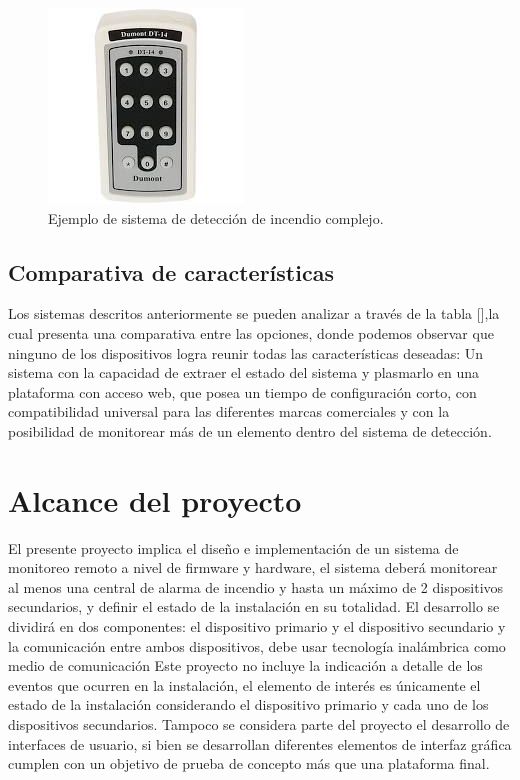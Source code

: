 \begin{figure}[h]
	\centering
	\includegraphics[scale=.4]{./Figures/Capitulo1/FIG_G1.jpeg}
	\caption{Ejemplo de sistema de detección de incendio complejo.}
	\label{fig:figura_g1}
\end{figure}

\subsection{Comparativa de características}

Los sistemas descritos anteriormente se pueden analizar a través de la tabla [],la cual  presenta una comparativa entre las opciones, donde podemos observar que ninguno de los dispositivos logra reunir todas las características deseadas: Un sistema con la capacidad de extraer el estado del sistema y plasmarlo en una plataforma con acceso web, que posea un tiempo de configuración corto, con compatibilidad universal para las diferentes marcas comerciales y con la posibilidad de monitorear más de un elemento dentro del sistema de detección.



\section{Alcance del proyecto}

El presente proyecto implica el diseño e implementación de un sistema de monitoreo remoto a nivel de firmware y hardware, el sistema deberá monitorear al menos una central de alarma de incendio y hasta un máximo de 2 dispositivos secundarios, y definir el estado de la instalación en su totalidad.
El desarrollo se dividirá en dos componentes: el dispositivo primario y el dispositivo secundario y la comunicación entre ambos dispositivos, debe usar tecnología inalámbrica como medio de comunicación 
Este proyecto no incluye la indicación a detalle de los eventos que ocurren en la instalación, el elemento de interés es únicamente el estado de la instalación considerando el dispositivo primario y cada uno de los dispositivos secundarios. Tampoco se considera parte del proyecto el desarrollo de interfaces de usuario, si bien se desarrollan diferentes elementos de interfaz gráfica cumplen con un objetivo de prueba de concepto más que una plataforma final.


